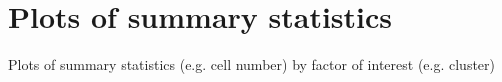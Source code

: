 \section{Plots of summary statistics}

Plots of summary statistics (e.g. cell number) by factor of interest (e.g. cluster)



\clearpage
